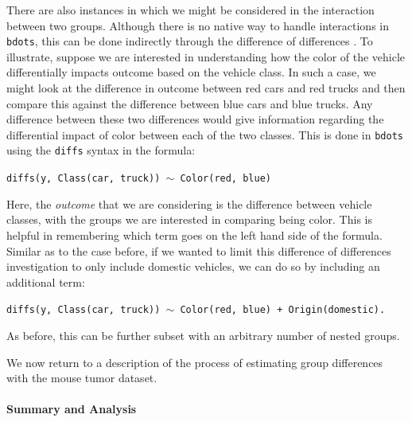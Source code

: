 \documentclass{article}
\newcommand{\xt}{\texttt}%
\begin{document}
There are also instances in which we might be considered in the interaction between two groups. Although there is no native way to handle interactions in \xt{bdots}, this can be done indirectly through the difference of differences \citep{McMurray2019}. To illustrate, suppose we are interested in understanding how the color of the vehicle differentially impacts outcome based on the vehicle class. In such a case, we might look at the difference in outcome between red cars and red trucks and then compare this against the difference between blue cars and blue trucks. Any difference between these two differences would give information regarding the differential impact of color between each of the two classes. This is done in \xt{bdots} using the \xt{diffs} syntax in the formula:
\begin{center}
\tt diffs(y, Class(car, truck)) $\sim$ Color(red, blue)
\end{center}
Here, the \textit{outcome} that we are considering is the difference between vehicle classes, with the groups we are interested in comparing being color. This is helpful in remembering which term goes on the left hand side of the formula. Similar as to the case before, if we wanted to limit this difference of differences investigation to only include domestic vehicles, we can do so by including an additional term:
\begin{center}
\tt diffs(y, Class(car, truck)) $\sim$ Color(red, blue) + Origin(domestic).
\end{center}
As before, this can be further subset with an arbitrary number of nested groups.

We now return to a description of the process of estimating group differences with the mouse tumor dataset.


\paragraph{Summary and Analysis}
\end{document}
